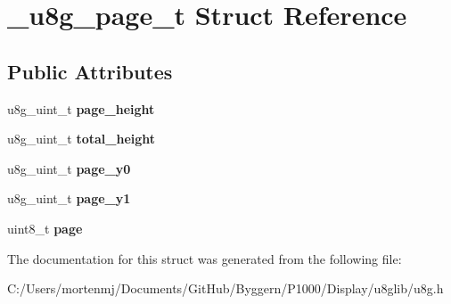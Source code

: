 \hypertarget{struct__u8g__page__t}{\section{\-\_\-u8g\-\_\-page\-\_\-t Struct Reference}
\label{struct__u8g__page__t}
}
\subsection*{Public Attributes}
\begin{DoxyCompactItemize}
\item 
\hypertarget{struct__u8g__page__t_a0162c1920d176413c545073444fb5183}{u8g\-\_\-uint\-\_\-t {\bfseries page\-\_\-height}}\label{struct__u8g__page__t_a0162c1920d176413c545073444fb5183}

\item 
\hypertarget{struct__u8g__page__t_a3de9dda2dfd8562bef7469c323014b53}{u8g\-\_\-uint\-\_\-t {\bfseries total\-\_\-height}}\label{struct__u8g__page__t_a3de9dda2dfd8562bef7469c323014b53}

\item 
\hypertarget{struct__u8g__page__t_adf5d0b63bc2e81e027f4b64b05ed4b80}{u8g\-\_\-uint\-\_\-t {\bfseries page\-\_\-y0}}\label{struct__u8g__page__t_adf5d0b63bc2e81e027f4b64b05ed4b80}

\item 
\hypertarget{struct__u8g__page__t_a25e9ad54c785861737f06f525a527468}{u8g\-\_\-uint\-\_\-t {\bfseries page\-\_\-y1}}\label{struct__u8g__page__t_a25e9ad54c785861737f06f525a527468}

\item 
\hypertarget{struct__u8g__page__t_a052b7240e6c2b340c8d513270c48899c}{uint8\-\_\-t {\bfseries page}}\label{struct__u8g__page__t_a052b7240e6c2b340c8d513270c48899c}

\end{DoxyCompactItemize}


The documentation for this struct was generated from the following file\-:\begin{DoxyCompactItemize}
\item 
C\-:/\-Users/mortenmj/\-Documents/\-Git\-Hub/\-Byggern/\-P1000/\-Display/u8glib/u8g.\-h\end{DoxyCompactItemize}
